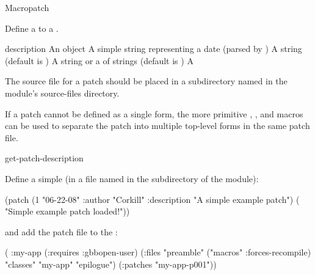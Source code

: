 \documentclass[10pt,twoside,english,pdftex]{article}
\begin{document}
\begin{functiondoc}{Macro}{patch}%
  {\code{(}
    }
%
%

\fnsyntax 

\fnpurpose Define a  to a .

\fnpackage {}

\fnmodule {}

\fnargs
\begin{args}{description}
\arg[id] An object
\arg[date] A simple string representing a date (parsed by 
  )
\arg[author] A string (default is )
\arg[description] A string or a  of strings (default is \nil)
\arg[form] A 
\end{args}

\fndescription 
%
The source file for a patch should be placed in a subdirectory named
 in the module's source-files directory.

If a patch cannot be defined as a single  form, the more
primitive ,
, and
 macros can be used to separate the
patch into multiple top-level forms in the same patch file.

\begin{alsos}{get-patch-description}
\also[undefmethod]
\end{alsos}

\fnexample 
%
Define a simple  (in a file named 
in the  subdirectory of the module):
%
%
%
%
\W\supp
\begin{example}
  (patch (1 "06-22-08" 
            :author "Corkill"
            :description "A simple example patch")
      ( "Simple example patch loaded!"))
\end{example}
%
and add the patch file to the  :
%
\W\supp\notpretop
\begin{example}
  ( :my-app
    (:requires :gbbopen-user)
    (:files "preamble"
            ("macros" :forces-recompile)
            "classes"
            "my-app"
            "epilogue")
    (:patches "my-app-p001"))
\end{example}

\end{functiondoc}
\end{document}
